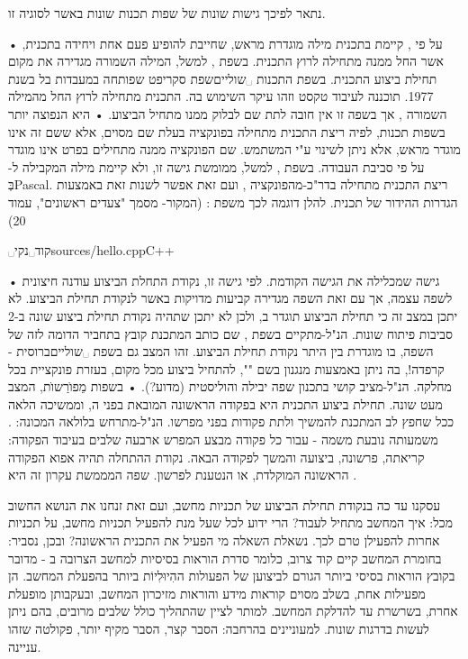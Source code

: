 נתאר לפיכך גישות שונות של שפות תכנות שונות באשר לסוגיה זו.
\begin{enumerate}
• על פי , קיימת בתכנית מילה מוגדרת מראש, שחייבת להופיע פעם אחת ויחידה בתכנית, אשר החל ממנה מתחילה לרוץ התכנית. בשפת , למשל, המילה השמורה  מגדירה את מקום תחילת ביצוע התכנית. בשפת התכנות ␣שוליים{שפת סקריפט שפותחה במעבדות בל בשנת 1977. תוכננה לעיבוד טקסט וזהו עיקר השימוש בה.} התכנית מתחילה לרוץ החל מהמילה השמורה , אך בשפה זו אין חובה לתת שם לבלוק ממנו מתחיל הביצוע.
•   היא הנפוצה יותר בשפות תכנות, לפיה ריצת התכנית מתחילה בפונקציה בעלת שם מסוים, אלא ששם זה אינו מוגדר מראש, אלא ניתן לשינוי ע"י המשתמש. שם הפונקציה ממנה מתחילים
בפרט אינו מוגדר על פי סביבת העבודה. בשפת , למשל, ממומשת גישה זו, ולא קיימת מילה המקבילה
ל- בְּPascal. ריצת התכנית מתחילה בדר"כ-מהפונקציה , ועם זאת אפשר לשנות זאת באמצעות
הגדרות ההידור של תכנית. להלן דוגמה לכך משפת : (המקור- מסמך "צעדים ראשונים", עמוד 20)

␣קוד␣נקי{sources/hello.cpp}{C++}

•  גישה שמכלילה את הגישה הקודמת. לפי גישה זו, נקודת התחלת הביצוע עודנה חיצונית לשפה עצמה, אך עם זאת השפה מגדירה קביעות מדויקות באשר לנקודת תחילת הביצוע. לא יתכן במצב זה כי תחילת הביצוע תוגדר ב, ולכן לא יתכן שתהיה נקודת תחילת ביצוע שונה ב-2 סביבות פיתוח שונות. הנ"ל-מתקיים בשפת , שם כותב המתכנת קובץ בתחביר הדומה לזה של השפה, בו מוגדרת בין היתר נקודת תחילת הביצוע. זהו המצב גם בשפת ␣שוליים{ברוסית - קרפדה!}, בה ניתן באמצעות מנגנון בשם "", להתחיל ביצוע מכל מקום, בעזרת פונקציית  בכל מחלקה. הנ"ל-מציב קושי בתכנון שפה יבילה והוליסטית (מדוע?).
•  בשפות מֵפוׂרַשוׂת, המצב מעט שונה. תחילת ביצוע התכנית היא בפקודה הראשונה המובאת בפני ה, וממשיכה הלאה ככל שחפץ לב המתכנת להמשיך ולתת פקודות בפני מפרשו. הנ"ל-מתרחש בלולאה המכונה: . משמעותה נובעת משמה - עבור כל פקודה מבצע המפרש ארבעה שלבים בעיבוד הפקודה: קריאתה, פרשונה, ביצועה והמשך לפקודה הבאה. נקודת ההתחלה תהיה אפוא הפקודה הראשונה המוקלדת, או הנטענת לפרשון. שפה המממשת עקרון זה היא .
\end{enumerate}

עסקנו עד כה בנקודת תחילת הביצוע של תכניות מחשב, ועם זאת זנחנו את הנושא החשוב מכל: איך המחשב מתחיל לעבוד? הרי ידוע לכל שעל מנת להפעיל תכניות מחשב, על תכניות אחרות להפעילן טרם לכך. נשאלת השאלה מי הפעיל את התכנית הראשונה? ובכן, נסביר: בחומרת המחשב קיים קוד צרוב, כלומר סדרת הוראות בסיסיות למחשב הצרובה ב - מדובר בקובץ הוראות בסיסי ביותר הגורם לביצוען של הפעולות ההִיוּלִיוֹת ביותר בהפעלת המחשב. הן מפעילות אחת, בשלב מסוים קוראות מידע והוראות מזיכרון המחשב, ובעקבותן מופעלת אחרת, בשרשרת עד להדלקת המחשב. למותר לציין שהתהליך כולל שלבים מרובים, בהם ניתן לעשות בדרגות שונות. למעוניינים בהרחבה: הסבר קצר, הסבר מקיף יותר, פקולטה שזהו עניינה.


